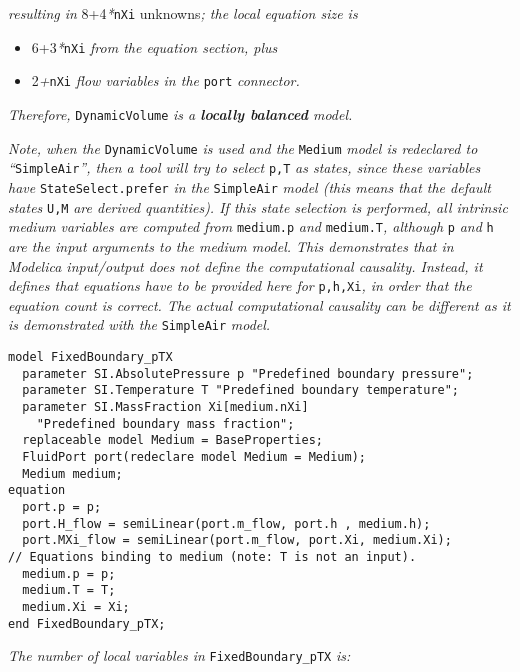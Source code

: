 \emph{resulting in} 8+4\emph{*}\lstinline!nXi! unknowns\emph{; the local equation
size is }

\begin{itemize}
\item
  6+3\emph{*}\lstinline!nXi! \emph{from the equation section, plus}
\item
  2\emph{+}\lstinline!nXi! \emph{flow variables in the} \lstinline!port! \emph{connector. }
\end{itemize}

\emph{Therefore,} \lstinline!DynamicVolume! \emph{is a \textbf{locally balanced}
model.}

\emph{Note, when the} \lstinline!DynamicVolume! \emph{is used and the} \lstinline!Medium!
\emph{model is redeclared to ``}\lstinline!SimpleAir!\emph{'', then a tool will try
to select} \lstinline!p,T! \emph{as states, since these variables have}
\lstinline!StateSelect.prefer! \emph{in the} \lstinline!SimpleAir! \emph{model (this means that
the default states} \lstinline!U,M! \emph{are derived quantities). If this state
selection is performed, all intrinsic medium variables are computed
from} \lstinline!medium.p! \emph{and} \lstinline!medium.T!\emph{, although}
\lstinline!p! \emph{and} \lstinline!h!
\emph{are the input arguments to the medium model. This demonstrates
that in Modelica input/output does not define the computational
causality. Instead, it defines that equations have to be provided here
for} \lstinline!p,h,Xi!\emph{, in order that the equation count is correct. The
actual computational causality can be different as it is demonstrated
with the} \lstinline!SimpleAir! \emph{model.}

\begin{lstlisting}[language=modelica]
model FixedBoundary_pTX
  parameter SI.AbsolutePressure p "Predefined boundary pressure";
  parameter SI.Temperature T "Predefined boundary temperature";
  parameter SI.MassFraction Xi[medium.nXi]
    "Predefined boundary mass fraction";
  replaceable model Medium = BaseProperties;
  FluidPort port(redeclare model Medium = Medium);
  Medium medium;
equation
  port.p = p;
  port.H_flow = semiLinear(port.m_flow, port.h , medium.h);
  port.MXi_flow = semiLinear(port.m_flow, port.Xi, medium.Xi);
// Equations binding to medium (note: T is not an input).
  medium.p = p;
  medium.T = T;
  medium.Xi = Xi;
end FixedBoundary_pTX;
\end{lstlisting}

\emph{The number of local variables in} \lstinline!FixedBoundary_pTX! \emph{is:}


